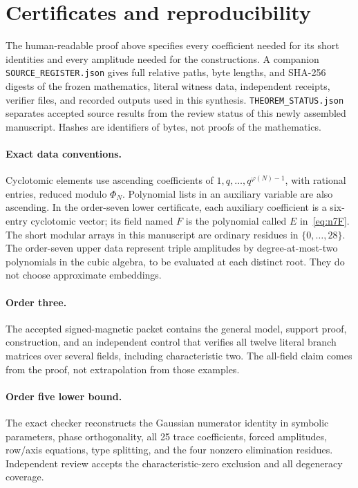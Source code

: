 \documentclass[11pt,letterpaper]{article}
\theoremstyle{definition}\newtheorem{definition}[theorem]{Definition}
\begin{document}
\section{Certificates and reproducibility}\label{sec:certificates}

The human-readable proof above specifies every coefficient needed for its short identities and every amplitude needed for the constructions. A companion \texttt{SOURCE\_REGISTER.json} gives full relative paths, byte lengths, and SHA-256 digests of the frozen mathematics, literal witness data, independent receipts, verifier files, and recorded outputs used in this synthesis. \texttt{THEOREM\_STATUS.json} separates accepted source results from the review status of this newly assembled manuscript. Hashes are identifiers of bytes, not proofs of the mathematics.

\paragraph{Exact data conventions.}
Cyclotomic elements use ascending coefficients of $1,q,\ldots,q^{\varphi(N)-1}$, with rational entries, reduced modulo $\Phi_N$. Polynomial lists in an auxiliary variable are also ascending. In the order-seven lower certificate, each auxiliary coefficient is a six-entry cyclotomic vector; its field named $F$ is the polynomial called $E$ in~\eqref{eq:n7F}. The short modular arrays in this manuscript are ordinary residues in $\{0,\ldots,28\}$. The order-seven upper data represent triple amplitudes by degree-at-most-two polynomials in the cubic algebra, to be evaluated at each distinct root. They do not choose approximate embeddings.

\paragraph{Order three.}
The accepted signed-magnetic packet contains the general model, support proof, construction, and an independent control that verifies all twelve literal branch matrices over several fields, including characteristic two. The all-field claim comes from the proof, not extrapolation from those examples.

\paragraph{Order five lower bound.}
The exact checker reconstructs the Gaussian numerator identity in symbolic parameters, phase orthogonality, all 25 trace coefficients, forced amplitudes, row/axis equations, type splitting, and the four nonzero elimination residues. Independent review accepts the characteristic-zero exclusion and all degeneracy coverage.
\end{document}
